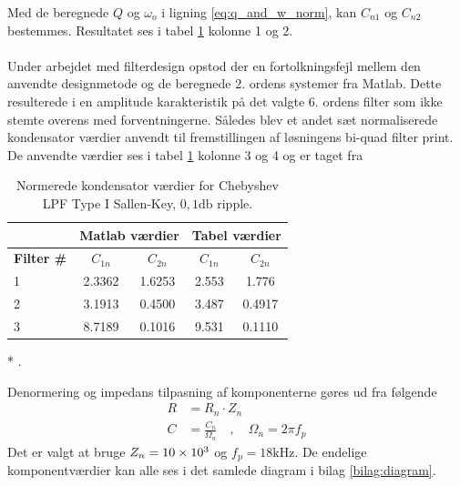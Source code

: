 Med de beregnede $Q$ og $\omega_o$ i ligning \ref{eq:q_and_w_norm}, kan $C_{n1}$ og $C_{n2}$ bestemmes.
Resultatet ses i tabel \ref{tab:sallen_key} kolonne 1 og 2.
\\
\\
Under arbejdet med filterdesign opstod der en fortolkningsfejl mellem den anvendte designmetode og de beregnede 2. ordens systemer fra Matlab.
Dette resulterede i en amplitude karakteristik på det valgte 6. ordens filter som ikke stemte overens med forventningerne.
Således blev et andet sæt normaliserede kondensator værdier anvendt til fremstillingen af løsningens bi-quad filter print.
De anvendte værdier ses i tabel \ref{tab:sallen_key} kolonne 3 og 4 og er taget fra \cite[Table B-2: Capacitor Values for 0.1-dB Chebyshev lowpass Sallen-Key filters, n=6]{sk_data_web}
\begin{table}[h!]
	\centering
	\caption{Normerede kondensator værdier for Chebyshev LPF Type I Sallen-Key, $0,1\si{\decibel}$ ripple.}
	\label{tab:sallen_key}
	\begin{threeparttable}
		\begin{tabular}{l c c c c}
			\toprule
			& \multicolumn{2}{c}{\textbf{Matlab værdier}} & \multicolumn{2}{c}{\textbf{Tabel værdier\tnote{(*)}}} \\ 
			\midrule
			\textbf{Filter \#} &
			\textbf{$C_{1n}$} 	& 
			\textbf{$C_{2n}$}  	&
			\textbf{$C_{1n}$} 		& 
			\textbf{$C_{2n}$} 	\\
			\midrule
			1 & \num{2.3362} & \num{1.6253} & \num{2.553} & \num{1.776} \\
			2 & \num{3.1913} & \num{0.4500} & \num{3.487} & \num{0.4917} \\
			3 & \num{8.7189} & \num{0.1016} & \num{9.531} & \num{0.1110} \\
			\bottomrule
		\end{tabular}
		
		\begin{tablenotes}
			\item[*] \cite[Table B-2: Chebyshev lowpass Sallen-Key filters, n=6]{sk_data_web}.
		\end{tablenotes}
	\end{threeparttable}
\end{table}

Denormering og impedans tilpasning af komponenterne gøres ud fra følgende
\begin{align}
	R &= R_n \cdot Z_n \\
	C &= \frac{C_n}{\Omega_n} \quad , \quad \Omega_n = 2\pi f_p 
\end{align} 
Det er valgt at bruge $Z_n = \num{10E3}$ og $f_p = 18\si{\kilo\hertz}$.
De endelige komponentværdier kan alle ses i det samlede diagram i bilag \ref{bilag:diagram}.